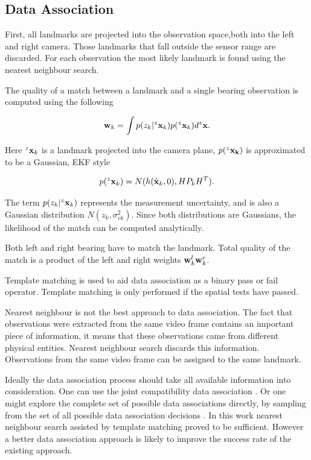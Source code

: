 \subsection{Data Association}

First, all landmarks are projected into the observation space,both
into the left and right camera. Those landmarks that fall outside the
sensor range are discarded. For each observation the most likely
landmark is found using the nearest neighbour search. 

The quality of a match between a landmark and a single bearing
observation is computed using the following

$$
  {\bf w}_k = \int p(z_k|^z{\bf x}_k)p(^z{\bf x}_k) d^z{\bf x}.
$$

Here $^z{\bf x}_k$ is a landmark projected into the camera plane,
$p(^z{\bf x_k})$ is approximated to be a Gaussian, EKF style

$$
p(^z{\bf x}_k) = N(h(\hat{\bf x}_k,0), H P_k H^T).
$$

The term $p(z_k|^z{\bf x}_k)$ represents the measurement uncertainty,
and is also a Gaussian distribution $N(z_k ,\sigma^2_{vk})$. Since
both distributions are Gaussians, the likelihood of the match can be
computed analytically.

Both left and right bearing have to match the landmark. Total quality
of the match is a product of the left and right weights ${\bf
w}^l_k{\bf w}^r _k$.

Template matching is used to aid data association as a binary pass or
fail operator. Template matching is only performed if the spatial
tests have passed.

Nearest neighbour is not the best approach to data association. The
fact that observations were extracted from the same video frame
contains an important piece of information, it means that these
observations came from different physical entities. Nearest neighbour
search discards this information. Observations from the same video
frame can be assigned to the same landmark.

Ideally the data association process should take all available
information into consideration. One can use the joint compatibility
data association \cite{neira01:_data_assoc_stoch_mappin_using}. Or one
might explore the complete set of possible data associations directly,
by sampling from the set of all possible data association decisions
\cite{nieto2003}. In this work nearest neighbour search assisted by
template matching proved to be sufficient. However a better data
association approach is likely to improve the success rate of the
existing approach.


